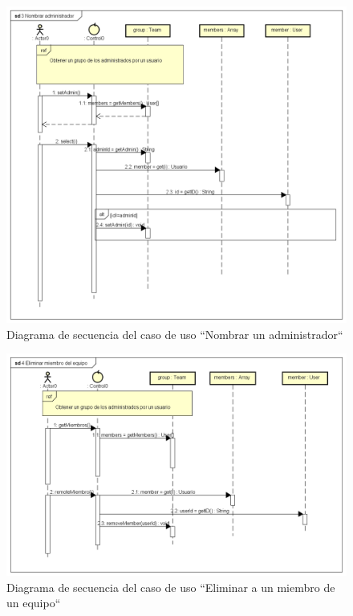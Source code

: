 \documentclass[twoside]{report}
\begin{document}
\begin{figure}[H]
\includegraphics[scale=0.5]{images/sequence/setAdmin}
\caption{Diagrama de secuencia del caso de uso “Nombrar un administrador“}
\end{figure}

\begin{figure}[H]
\includegraphics[scale=0.5]{images/sequence/deleleMemberGroup}
\caption{Diagrama de secuencia del caso de uso “Eliminar a un miembro de un equipo“}
\end{figure}
\end{document}
